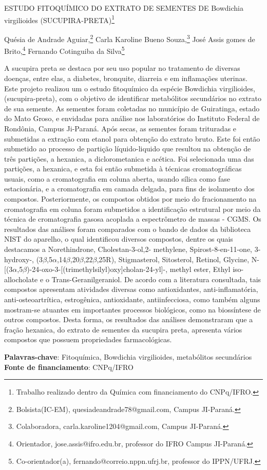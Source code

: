 \documentclass[article,12pt,onesidea,4paper,english,brazil]{abntex2}
\begin{document}
	
	
	\frenchspacing 
	
	\begin{center}
		\LARGE ESTUDO FITOQUÍMICO DO EXTRATO DE SEMENTES DE Bowdichia
		virgilioides (SUCUPIRA-PRETA)\footnote{Trabalho realizado dentro da Química com financiamento do CNPq/IFRO.}
		
		\normalsize
		Quésia de Andrade Aguiar,\footnote{Bolsista(IC-EM), quesiadeandrade78@gmail.com, Campus JI-Paraná.} 
	Carla Karoline Bueno Souza,\footnote{Colaboradora, carla.karoline1204@gmail.com, Campus JI-Paraná.} 
			José Assis gomes de Brito,\footnote{Orientador, jose.assis@ifro.edu.br, professor do IFRO Campus JI-Paraná.} 
		Fernando Cotinguiba da Silva\footnote{Co-orientador(a), fernando@correio.nppn.ufrj.br, professor do IPPN/UFRJ.} 
	\end{center}
	
	\noindent A sucupira preta se destaca por seu uso popular no tratamento de diversas doenças,
	entre elas, a diabetes, bronquite, diarreia e em inflamações uterinas. Este projeto
	realizou um o estudo fitoquímico da espécie Bowdichia virgilioides, (sucupira-preta),
	com o objetivo de identificar metabólitos secundários no extrato de sua semente. As
	sementes foram coletadas no município de Guiratinga, estado do Mato Groso, e
	envidadas para análise nos laboratórios do Instituto Federal de Rondônia, Campus
	Ji-Paraná. Após secas, as sementes foram trituradas e submetidas a extração com
	etanol para obtenção do extrato bruto. Este foi então submetido ao processo de
	partição líquido-liquido que resultou na obtenção de três partições, a hexanica, a
	diclorometanica e acética. Foi selecionada uma das partições, a hexanica, e esta foi
	então submetida à técnicas cromatográficas usuais, como a cromatografia em
	coluna aberta, usando sílica como fase estacionária, e a cromatografia em camada
	delgada, para fins de isolamento dos compostos. Posteriormente, os compostos
	obtidos por meio do fracionamento na cromatografia em coluna foram submetidos a
	identificação estrutural por meio da técnica de cromatografia gasosa acoplada a
	espectrômetro de massas - CGMS. Os resultados das análises foram comparados
	com o bando de dados da biblioteca NIST do aparelho, o qual identificou diversos
	compostos, dentre os quais destacamos a Norethindrone, Cholestan-3-ol,2-
	methylene, Spirost-8-en-11-one, 3-hydroxy-, (3$\beta$,5$\alpha$,14$\beta$,20$\beta$,22$\beta$,25R), Stigmasterol,
	Sitosterol, Retinol, Glycine, N-[(3$\alpha$,5$\beta$)-24-oxo-3-[(trimethylsilyl)oxy]cholan-24-yl]-,
	methyl ester, Ethyl iso-allocholate e o Trans-Geranilgeraniol. De acordo com a
	literatura consultada, tais compostos apresentam atividades diversas como
	antioxidantes, anti-inflamatória, anti-osteoartrítica, estrogênica, antioxidante, antiinfecciosa,
	como também alguns mostram-se atuantes em importantes processos
	biológicos, como na biossíntese de outros compostos. Desta forma, os resultados
	das análises demonstraram que a fração hexanica, do extrato de sementes da
	sucupira preta, apresenta vários compostos que possuem propriedades
	farmacológicas.
	
	\vspace{\onelineskip}
	
	\noindent
	\textbf{Palavras-chave}: Fitoquímica, Bowdichia virgilioides, metabólitos secundários
	\textbf{Fonte de financiamento}: CNPq/IFRO
	
\end{document}
